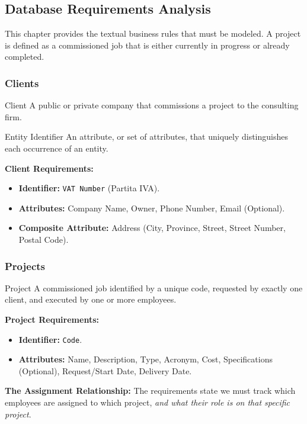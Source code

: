 \subsection{Database Requirements Analysis}
This chapter provides the textual business rules that must be modeled. A project is defined as a commissioned job that is either currently in progress or already completed.

\subsubsection{Clients}
\begin{defbox}{Client}
A public or private company that commissions a project to the consulting firm.
\end{defbox}

\begin{defbox}{Entity Identifier}
An attribute, or set of attributes, that uniquely distinguishes each occurrence of an entity.
\end{defbox}

\textbf{Client Requirements:}
\begin{itemize}
    \item \textbf{Identifier:} \texttt{VAT Number} (Partita IVA).
    \item \textbf{Attributes:} Company Name, Owner, Phone Number, Email (Optional).
    \item \textbf{Composite Attribute:} Address (City, Province, Street, Street Number, Postal Code).
\end{itemize}

\subsubsection{Projects}
\begin{defbox}{Project}
A commissioned job identified by a unique code, requested by exactly one client, and executed by one or more employees.
\end{defbox}

\textbf{Project Requirements:}
\begin{itemize}
    \item \textbf{Identifier:} \texttt{Code}.
    \item \textbf{Attributes:} Name, Description, Type, Acronym, Cost, Specifications (Optional), Request/Start Date, Delivery Date.
\end{itemize}

\textbf{The Assignment Relationship:}
The requirements state we must track which employees are assigned to which project, \textit{and what their role is on that specific project}.

